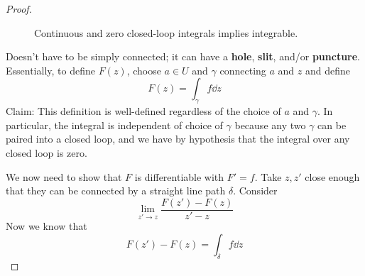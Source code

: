 \documentclass[../notes.tex]{subfiles}
\begin{document}
\begin{itemize}
\begin{proof}
\begin{figure}[H]
            \caption{Continuous and zero closed-loop integrals implies integrable.}
            \label{fig:contLoopInteg}
        \end{figure}
        Doesn't have to be simply connected; it can have a \textbf{hole}, \textbf{slit}, and/or \textbf{puncture}. Essentially, to define $F(z)$, choose $a\in U$ and $\gamma$ connecting $a$ and $z$ and define
        \begin{equation*}
            F(z) = \int_\gamma f\dd{z}
        \end{equation*}
        Claim: This definition is well-defined regardless of the choice of $a$ and $\gamma$. In particular, the integral is independent of choice of $\gamma$ because any two $\gamma$ can be paired into a closed loop, and we have by hypothesis that the integral over any closed loop is zero.\par
        We now need to show that $F$ is differentiable with $F'=f$. Take $z,z'$ close enough that they can be connected by a straight line path $\delta$. Consider
        \begin{equation*}
            \lim_{z'\to z}\frac{F(z')-F(z)}{z'-z}
        \end{equation*}
        Now we know that
        \begin{equation*}
            F(z')-F(z) = \int_\delta f\dd{z}

\end{equation*}
\end{proof}
\end{itemize}
\end{document}
